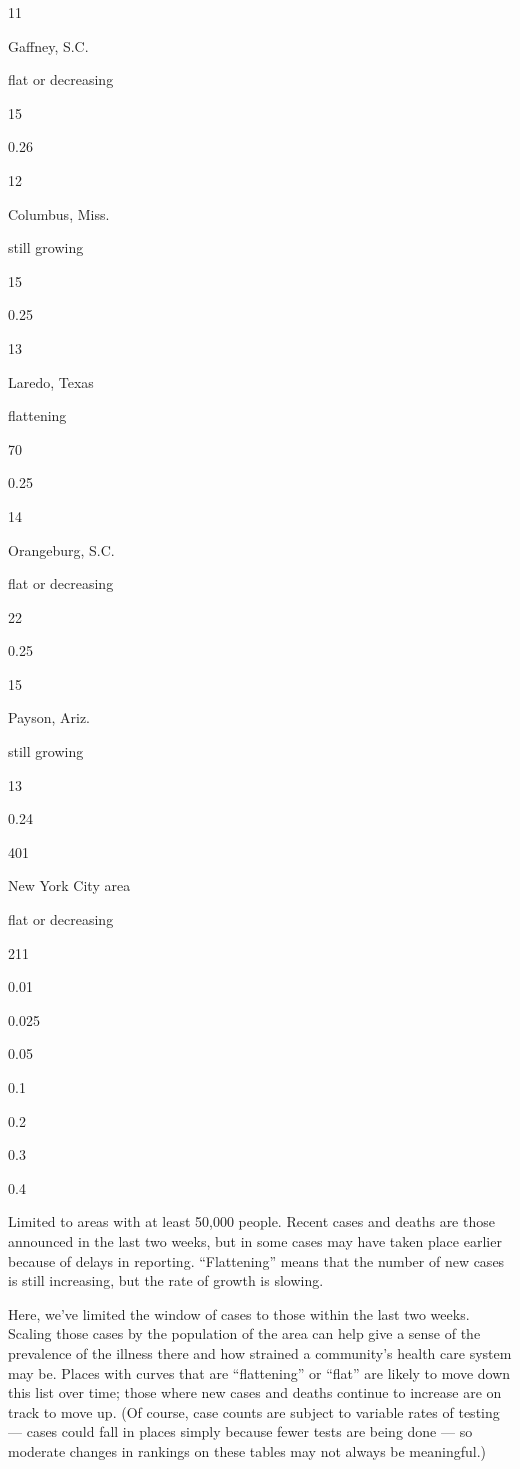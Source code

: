 11

Gaffney, S.C.

flat or decreasing

15

0.26

12

Columbus, Miss.

still growing

15

0.25

13

Laredo, Texas

flattening

70

0.25

14

Orangeburg, S.C.

flat or decreasing

22

0.25

15

Payson, Ariz.

still growing

13

0.24

401

New York City area

flat or decreasing

211

0.01

0.025

0.05

0.1

0.2

0.3

0.4

Limited to areas with at least 50,000 people. Recent cases and deaths
are those announced in the last two weeks, but in some cases may have
taken place earlier because of delays in reporting. ``Flattening'' means
that the number of new cases is still increasing, but the rate of growth
is slowing.

Here, we've limited the window of cases to those within the last two
weeks. Scaling those cases by the population of the area can help give a
sense of the prevalence of the illness there and how strained a
community's health care system may be. Places with curves that are
``flattening'' or ``flat'' are likely to move down this list over time;
those where new cases and deaths continue to increase are on track to
move up. (Of course, case counts are subject to variable rates of
testing --- cases could fall in places simply because fewer tests are
being done --- so moderate changes in rankings on these tables may not
always be meaningful.)


